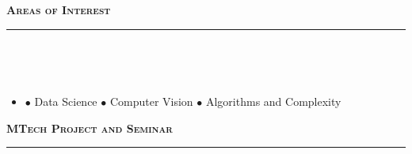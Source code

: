 \documentclass[a4paper,10pt]{article}
\newcommand{\lsep}{-0.5cm}
\newcommand{\resheading}[1]{{\small
        {
            \begin{minipage}
                {0.992\textwidth}\textbf{{\textsc{#1 \vphantom{p\^{E}} }}}
                \\[-0.3cm]
                \hrule
            \end{minipage}
            \\[-0.5cm]
        }
 }}
\begin{document}
\hspace{0.2cm}\\
\hspace{0.2cm}\\
\hspace{0.2cm}\\
\hspace{0.2cm}\\
\hspace{0.2cm}\\
\hspace{0.2cm}\\
\hspace{0.2cm}\\
\hspace{0.2cm}\\
\hspace{0.2cm}\\
\hspace{0.2cm}\\
\hspace{0.2cm}\\
\hspace{0.2cm}\\
\hspace{0.2cm}\\
\hspace{0.5cm}\\
\resheading{\textbf{\large Areas of Interest}}\\[\lsep]
    \begin{itemize}
    \item[] 
    \hspace{-0.4cm} $\bullet$ Data Science 
    \hspace{0.2cm} $\bullet$ Computer Vision
   \hspace{0.2cm} $\bullet$ Algorithms and Complexity
\end{itemize}
\resheading{\textbf{\large MTech Project and Seminar}}\\[\lsep] 
\\ [-0.3cm]
\end{document}
